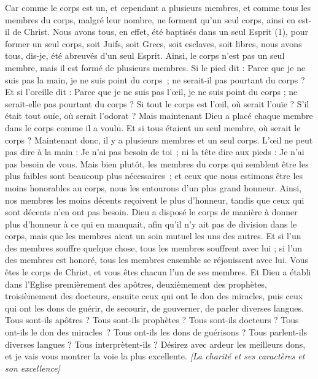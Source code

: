 \begin{multicols}{2}
Car comme le corps est un, et cependant a plusieurs membres, et comme tous les membres du corps, malgré leur nombre, ne forment qu’un seul corps, ainsi en est-il de Christ.
Nous avons tous, en effet, été baptisés dans un seul Esprit (1), pour former un seul corps, soit Juifs, soit Grecs, soit esclaves, soit libres, nous avons tous, dis-je, été abreuvés d'un seul Esprit.
Ainsi, le corps n’est pas un seul membre, mais il est formé de plusieurs membres.
Si le pied dit : Parce que je ne suis pas la main, je ne suis point du corps ; ne serait-il pas pourtant du corps ?
Et si l'oreille dit : Parce que je ne suis pas l’œil, je ne suis point du corps ; ne serait-elle pas pourtant du corps ?
Si tout le corps est l’œil, où serait l'ouïe ? S’il était tout ouïe, où serait l'odorat ?
Mais maintenant Dieu a placé chaque membre dans le corps comme il a voulu.
Et si tous étaient un seul membre, où serait le corps ?
Maintenant donc, il y a plusieurs membres et un seul corps.
L’œil ne peut pas dire à la main : Je n'ai pas besoin de toi ; ni la tête dire aux pieds : Je n'ai pas besoin de vous.
Mais bien plutôt, les membres du corps qui semblent être les plus faibles sont beaucoup plus nécessaires ;
et ceux que nous estimons être les moins honorables au corps, nous les entourons d’un plus grand honneur. Ainsi, nos membres les moins décents reçoivent le plus d’honneur,
tandis que ceux qui sont décents n’en ont pas besoin. Dieu a disposé le corps de manière à donner plus d’honneur à ce qui en manquait,
afin qu'il n'y ait pas de division dans le corps, mais que les membres aient un soin mutuel les uns des autres.
Et si l'un des membres souffre quelque chose, tous les membres souffrent avec lui ; si l'un des membres est honoré, tous les membres ensemble se réjouissent avec lui.
Vous êtes le corps de Christ, et vous êtes chacun l’un de ses membres.
Et Dieu a établi dans l'Eglise premièrement des apôtres, deuxièmement des prophètes, troisièmement des docteurs, ensuite ceux qui ont le don des miracles, puis ceux qui ont les dons de guérir, de secourir, de gouverner, de parler diverses langues.
Tous sont-ils apôtres ? Tous sont-ils prophètes ? Tous sont-ils docteurs ? Tous ont-ils le don des miracles ?
Tous ont-ils les dons de guérisons ? Tous parlent-ils diverses langues ? Tous interprètent-ils ?
Désirez avec ardeur les meilleurs dons, et je vais vous montrer la voie la plus excellente.
\textit{[La charité et ses caractères et son excellence]}

\end{multicols}

